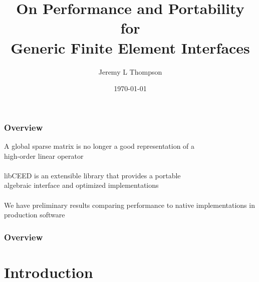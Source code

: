 \documentclass{beamer}
\title[Generic Finite Element Interfaces]{On Performance and Portability for\\Generic Finite Element Interfaces} %
\author{Jeremy L Thompson} %
\institute[CU Boulder] %
{University of Colorado Boulder \\ %
\medskip
\textit{jeremy.thompson@colorado.edu} %
}
\date{\today} %
\begin{document}
\begin{frame}
\titlepage %
\end{frame}


\begin{frame}
\begin{center}
\frametitle{Overview}

A global sparse matrix is no longer a good representation of a\\high-order linear operator\\

~\\

libCEED is an extensible library that provides a portable\\algebraic interface and optimized implementations\\

~\\

We have preliminary results comparing performance to native implementations in production software

\end{center}
\end{frame}
 

\begin{frame}
\frametitle{Overview} %
\tableofcontents %
\end{frame}


\section{Introduction}
\end{document}
